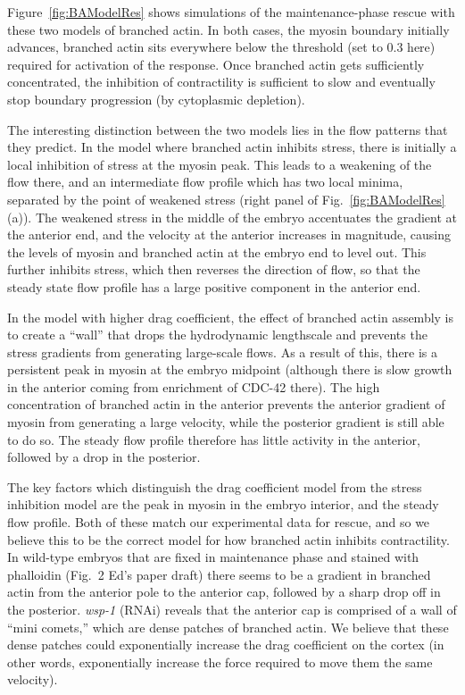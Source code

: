 \documentclass[11pt]{article}
\newcommand{\6}[1]{#1_{\text{6}}}
\newcommand{\3}[1]{#1_{\text{3}}}
\begin{document}
Figure\ \ref{fig:BAModelRes} shows simulations of the maintenance-phase rescue with these two models of branched actin. In both cases, the myosin boundary initially advances, branched actin sits everywhere below the threshold (set to 0.3 here) required for activation of the response. Once branched actin gets sufficiently concentrated, the inhibition of contractility is sufficient to slow and eventually stop boundary progression (by cytoplasmic depletion). 

The interesting distinction between the two models lies in the flow patterns that they predict. In the model where branched actin inhibits stress, there is initially a local inhibition of stress at the myosin peak. This leads to a weakening of the flow there, and an intermediate flow profile which has two local minima, separated by the point of weakened stress (right panel of Fig.\ \ref{fig:BAModelRes}(a)). The weakened stress in the middle of the embryo accentuates the gradient at the anterior end, and the velocity at the anterior increases in magnitude, causing the levels of myosin and branched actin at the embryo end to level out. This further inhibits stress, which then reverses the direction of flow, so that the steady state flow profile has a large positive component in the anterior end. 

In the model with higher drag coefficient, the effect of branched actin assembly is to create a ``wall'' that drops the hydrodynamic lengthscale and prevents the stress gradients from generating large-scale flows. As a result of this, there is a persistent peak in myosin at the embryo midpoint (although there is slow growth in the anterior coming from enrichment of CDC-42 there). The high concentration of branched actin in the anterior prevents the anterior gradient of myosin from generating a large velocity, while the posterior gradient is still able to do so. The steady flow profile therefore has little activity in the anterior, followed by a drop in the posterior. 

The key factors which distinguish the drag coefficient model from the stress inhibition model are the peak in myosin in the embryo interior, and the steady flow profile. Both of these match our experimental data for rescue, and so we believe this to be the correct model for how branched actin inhibits contractility. In wild-type embryos that are fixed in maintenance phase and stained with phalloidin (Fig.\ 2 Ed's paper draft) there seems to be a gradient in branched actin from the anterior pole to the anterior cap, followed by a sharp drop off in the posterior. \emph{wsp-1} (RNAi) reveals that the anterior cap is comprised of a wall of ``mini comets,'' which are dense patches of branched actin. We believe that these dense patches could exponentially increase the drag coefficient on the cortex (in other words, exponentially increase the force required to move them the same velocity).
\end{document}
